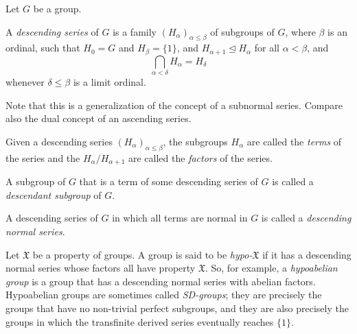 \documentclass[12pt]{article}
\def\normal{\trianglelefteq}
\begin{document}

Let $G$ be a group.

A \emph{descending series} of $G$
is a family $(H_\alpha)_{\alpha\le\beta}$ of subgroups of $G$,
where $\beta$ is an ordinal,
such that $H_0=G$ and $H_\beta=\{1\}$,
and $H_{\alpha+1}\normal H_\alpha$ for all $\alpha<\beta$,
and $$\bigcap_{\alpha<\delta}H_\alpha=H_\delta$$
whenever $\delta\le\beta$ is a limit ordinal.

Note that this is a generalization of the concept of a subnormal series.
Compare also the dual concept of an ascending series.

Given a descending series $(H_\alpha)_{\alpha\le\beta}$,
the subgroups $H_\alpha$ are called the \emph{terms} of the series
and the  $H_\alpha/H_{\alpha+1}$
are called the \emph{factors} of the series.

A subgroup of $G$ that is a term of some descending series of $G$
is called a \emph{descendant subgroup} of $G$.

A descending series of $G$
in which all terms are normal in $G$
is called a \emph{descending normal series}.

Let $\mathfrak{X}$ be a property of groups.
A group is said to be \emph{hypo-$\mathfrak{X}$}
if it has a descending normal series
whose factors all have property $\mathfrak{X}$.
So, for example, a \emph{hypoabelian group}
is a group that has a descending normal series with abelian factors.
Hypoabelian groups are sometimes called \emph{SD-groups};
they are precisely the groups that have no non-trivial perfect subgroups,
and they are also precisely the groups
in which the transfinite derived series eventually reaches $\{1\}$.

\end{document}
